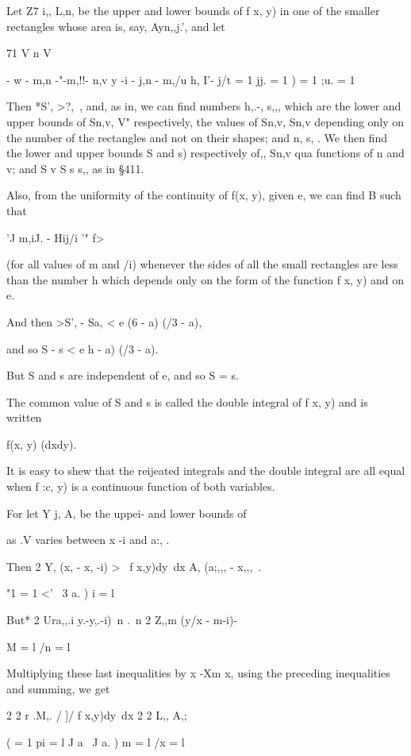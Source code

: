 Let Z7 i,, L,n, be the upper and lower bounds of f x, y) in one of
the smaller rectangles whose area is, say, Ayn,,j.', and let

71 V n V

- w - m,n -"-m,!!- n,v y -i - j,n - m,/u h, I'- j/t = 1 jj. = 1 ) = 1
;u. = 1

Then *S', >?, \,, and, as in, we can find numbers h,.-, s,,,
which are the lower and upper bounds of Sn,v, V" respectively, the
values of Sn,v, Sn,v depending only on the number of the rectangles
and not on their shapes; and n, s, . We then find the lower and upper
bounds S and s) respectively of,, Sn,v qua functions of n and v;
and S v S s s,, as in §411.

Also, from the uniformity of the continuity of f(x, y), given e, we
can find B such that

'J m,iJ. - Hij/i '" f>

(for all values of m and /i) whenever the sides of all the small
rectangles are less than the number h which depends only on the form
of the function f x, y) and on e.

And then >S', - Sa, < e (6 - a) (/3 - a),

and so S - s < e h - a) (/3 - a).

But S and s are independent of e, and so S = s.

The common value of S and s is called the double integral of f x, y)
and is written

f(x, y) (dxdy).

It is easy to shew that the reijeated integrals and the double
integral are all equal when f :c, y) is a continuous function of both
variables.

%
%

For let Y j, A, be the uppei- and lower bounds of

as .V varies between x -i and a:, .

Then 2 Y, (x, - x, -i) > \ f x,y)dy\ dx A, (a;,,, - x,,,\ .

"1 = 1 <' \ 3 a. ) i = l

But* 2 Ura,,.i y.-y,.-i) \,n .\ n 2 Z,,m (y/x - m-i)-

M = l /n = l

Multiplying these last inequalities by x -Xm x, using the preceding
inequalities and summing, we get

2 2 r .M,. / ]/ f x,y)dy\ dx 2 2 L,, A,;

 ( = 1 pi = l J a \ J a. ) m = l /x = l

